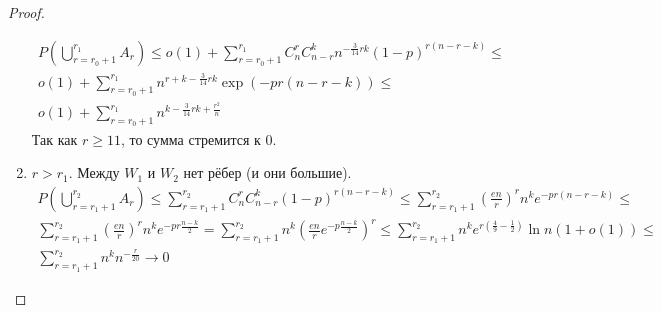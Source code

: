 \documentclass{article}
\begin{document}
\begin{proof}
\begin{enumerate}
\begin{multline*}
				P\left( \bigcup\limits_{r=r_0+1}^{r_1} A_r \right) \le o(1) +
				\sum\limits_{r=r_0+1}^{r_1} C_n^r C_{n-r}^k n^{-\frac{3}{14}rk} (1-p)^{r(n-r-k)} \le \\
				o(1) + \sum\limits_{r=r_0+1}^{r_1} n^{r+k - \frac{3}{14}rk} \exp(-pr(n-r-k)) \le \\
				o(1) + \sum\limits_{r=r_0+1}^{r_1} n^{k - \frac{3}{14}rk + \frac{r^2}{n}}
			\end{multline*}
			Так как $r \ge 11$, то сумма стремится к 0.
		\item $r > r_1$. Между $W_1$ и $W_2$ нет рёбер (и они большие).
			\begin{multline*}
				P\left( \bigcup\limits_{r=r_1+1}^{r_2} A_r \right) \le \sum\limits_{r=r_1+1}^{r_2} C_n^r
				C_{n-r}^k (1 - p)^{r(n-r-k)} \le \sum\limits_{r=r_1+1}^{r_2} \left(\frac{en}{r}\right)^r n^k
				e^{-pr(n-r-k)} \le \\
				\sum\limits_{r=r_1+1}^{r_2} \left( \frac{en}{r} \right)^r n^k e^{-pr \frac{n-k}{2}} =
				\sum\limits_{r=r_1+1}^{r_2} n^k \left( \frac{en}{r} e^{-p \frac{n-k}{2}}\right)^r \le
				\sum\limits_{r=r_1+1}^{r_2} n^k e^{r(\frac{4}{9} - \frac{1}{2})} \ln n (1 + o(1)) \le \\
				\sum\limits_{r=r_1+1}^{r_2} n^k n^{-\frac{r}{20}} \rightarrow 0
			\end{multline*}
	\end{enumerate}
\end{proof}
\end{document}

